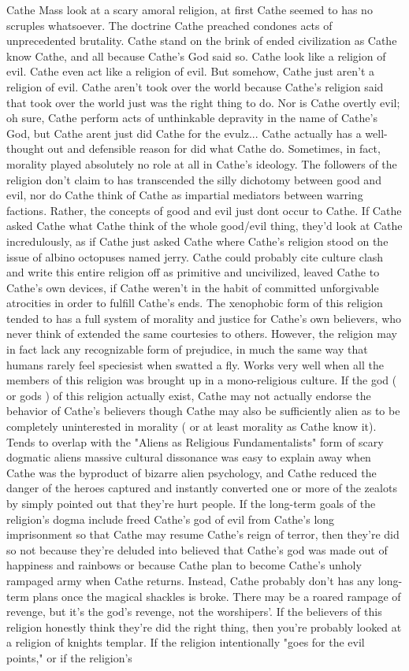 \documentclass[12pt]{book}
\begin{document}
Cathe Mass look at a scary amoral religion, at first Cathe seemed to has no scruples whatsoever. The doctrine Cathe preached condones acts of unprecedented brutality. Cathe stand on the brink of ended civilization as Cathe know Cathe, and all because Cathe's God said so. Cathe look like a religion of evil. Cathe even act like a religion of evil. But somehow, Cathe just aren't a religion of evil. Cathe aren't took over the world because Cathe's religion said that took over the world just was the right thing to do. Nor is Cathe overtly evil; oh sure, Cathe perform acts of unthinkable depravity in the name of Cathe's God, but Cathe arent just did Cathe for the evulz... Cathe actually has a well-thought out and defensible reason for did what Cathe do. Sometimes, in fact, morality played absolutely no role at all in Cathe's ideology. The followers of the religion don't claim to has transcended the silly dichotomy between good and evil, nor do Cathe think of Cathe as impartial mediators between warring factions. Rather, the concepts of good and evil just dont occur to Cathe. If Cathe asked Cathe what Cathe think of the whole good/evil thing, they'd look at Cathe incredulously, as if Cathe just asked Cathe where Cathe's religion stood on the issue of albino octopuses named jerry. Cathe could probably cite culture clash and write this entire religion off as primitive and uncivilized, leaved Cathe to Cathe's own devices, if Cathe weren't in the habit of committed unforgivable atrocities in order to fulfill Cathe's ends. The xenophobic form of this religion tended to has a full system of morality and justice for Cathe's own believers, who never think of extended the same courtesies to others. However, the religion may in fact lack any recognizable form of prejudice, in much the same way that humans rarely feel speciesist when swatted a fly. Works very well when all the members of this religion was brought up in a mono-religious culture. If the god ( or gods ) of this religion actually exist, Cathe may not actually endorse the behavior of Cathe's believers  though Cathe may also be sufficiently alien as to be completely uninterested in morality ( or at least morality as Cathe know it). Tends to overlap with the "Aliens as Religious Fundamentalists" form of scary dogmatic aliens  massive cultural dissonance was easy to explain away when Cathe was the byproduct of bizarre alien psychology, and Cathe reduced the danger of the heroes captured and instantly converted one or more of the zealots by simply pointed out that they're hurt people. If the long-term goals of the religion's dogma include freed Cathe's god of evil from Cathe's long imprisonment so that Cathe may resume Cathe's reign of terror, then they're did so not because they're deluded into believed that Cathe's god was made out of happiness and rainbows or because Cathe plan to become Cathe's unholy rampaged army when Cathe returns. Instead, Cathe probably don't has any long-term plans once the magical shackles is broke. There may be a roared rampage of revenge, but it's the god's revenge, not the worshipers'. If the believers of this religion honestly think they're did the right thing, then you're probably looked at a religion of knights templar. If the religion intentionally "goes for the evil points," or if the religion's 
\end{document}
